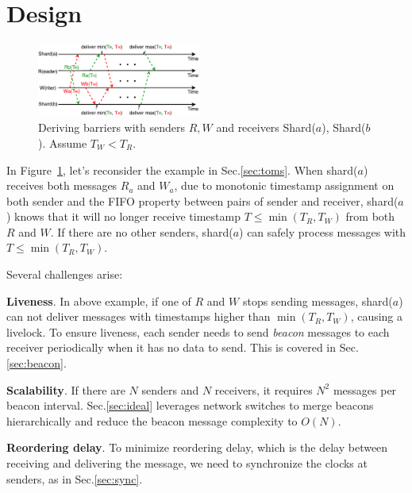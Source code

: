 \section{Design}
\label{sec:design}

\begin{figure}[t]
\centering
\includegraphics[width=0.48\textwidth]{images/derive_barriers.pdf}
\caption{Deriving barriers with senders $R, W$ and receivers Shard($a$), Shard($b$). Assume $T_W < T_R$.}
\label{fig:barrier}
\vspace{-1em}
\end{figure}

In Figure~\ref{fig:barrier}, let's reconsider the example in Sec.\ref{sec:toms}.
When shard($a$) receives both messages $R_a$ and $W_a$, due to monotonic timestamp assignment on both sender and the FIFO property between pairs of sender and receiver, shard($a$) knows that it will no longer receive timestamp $T \leq \min(T_R, T_W)$ from both $R$ and $W$.
If there are no other senders, shard($a$) can safely process messages with $T \leq \min(T_R, T_W)$.%

Several challenges arise:

\textbf{Liveness}.
In above example, if one of $R$ and $W$ stops sending messages, shard($a$) can not deliver messages with timestamps higher than $\min(T_R,T_W)$, causing a livelock.
To ensure liveness, each sender needs to send \textit{beacon} messages to each receiver  periodically when it has no data to send.
This is covered in Sec.\ref{sec:beacon}.

\textbf{Scalability}.
If there are $N$ senders and $N$ receivers, it requires $N^2$ messages per beacon interval.
Sec.\ref{sec:ideal} leverages network switches to merge beacons hierarchically and reduce the beacon message complexity to $O(N)$.

\textbf{Reordering delay}. To minimize reordering delay, which is the delay between receiving and delivering the message, we need to synchronize the clocks at senders, as in Sec.\ref{sec:sync}.

